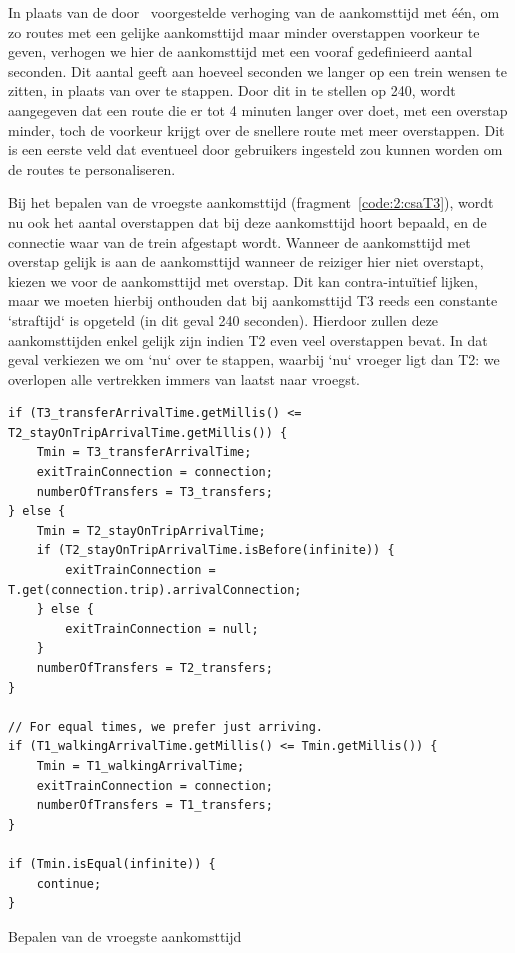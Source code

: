 In plaats van de door~\cite{strasser17} voorgestelde verhoging van de aankomsttijd met één, om zo routes met een gelijke aankomsttijd maar minder overstappen voorkeur te geven, verhogen we hier de aankomsttijd met een vooraf gedefinieerd aantal seconden. Dit aantal geeft aan hoeveel seconden we langer op een trein wensen te zitten, in plaats van over te stappen. Door dit in te stellen op 240, wordt aangegeven dat een route die er tot 4 minuten langer over doet, met een overstap minder, toch de voorkeur krijgt over de snellere route met meer overstappen. Dit is een eerste veld dat eventueel door gebruikers ingesteld zou kunnen worden om de routes te personaliseren.

Bij het bepalen van de vroegste aankomsttijd (fragment~\ref{code:2:csaT3}), wordt nu ook het aantal overstappen dat bij deze aankomsttijd hoort bepaald, en de connectie waar van de trein afgestapt wordt. Wanneer de aankomsttijd met overstap gelijk is aan de aankomsttijd wanneer de reiziger hier niet overstapt, kiezen we voor de aankomsttijd met overstap. Dit kan contra-intuïtief lijken, maar we moeten hierbij onthouden dat bij aankomsttijd T3 reeds een constante `straftijd` is opgeteld (in dit geval 240 seconden). Hierdoor zullen deze aankomsttijden enkel gelijk zijn indien T2 even veel overstappen bevat. In dat geval verkiezen we om `nu` over te stappen, waarbij `nu` vroeger ligt dan T2: we overlopen alle vertrekken immers van laatst naar vroegst.

\begin{listing}[htb]
\begin{verbatim}
if (T3_transferArrivalTime.getMillis() <= T2_stayOnTripArrivalTime.getMillis()) {
	Tmin = T3_transferArrivalTime;
	exitTrainConnection = connection;
	numberOfTransfers = T3_transfers;
} else {
	Tmin = T2_stayOnTripArrivalTime;
	if (T2_stayOnTripArrivalTime.isBefore(infinite)) {
		exitTrainConnection = T.get(connection.trip).arrivalConnection;
	} else {
		exitTrainConnection = null;
	}
	numberOfTransfers = T2_transfers;
}

// For equal times, we prefer just arriving.
if (T1_walkingArrivalTime.getMillis() <= Tmin.getMillis()) {
	Tmin = T1_walkingArrivalTime;
	exitTrainConnection = connection;
	numberOfTransfers = T1_transfers;
}

if (Tmin.isEqual(infinite)) {
	continue;
}
		\end{verbatim}
		\caption[CSA: Bepalen van vroegste aankomsttijd]{Bepalen van de vroegste aankomsttijd}
		\label{code:2:csaMin}
\end{listing}

